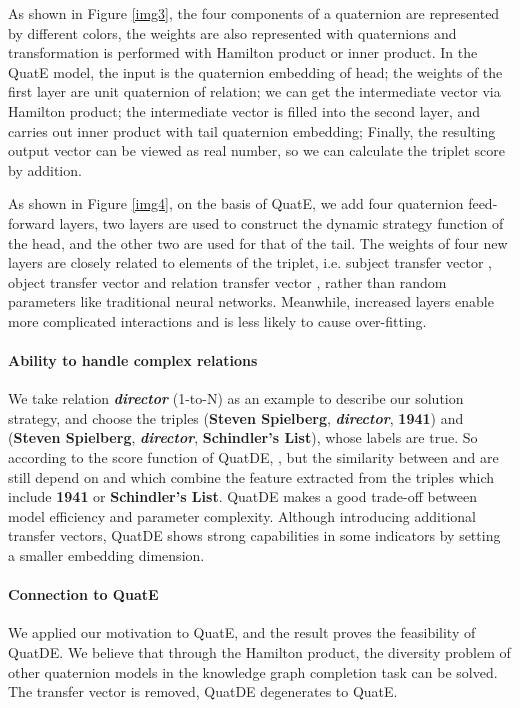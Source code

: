 \documentclass[letterpaper]{article} \usepackage{aaai20}  \usepackage{times}  \usepackage{helvet} \usepackage{courier}  \usepackage[hyphens]{url}  \usepackage{graphicx} \usepackage{lineno,hyperref,amsmath,amssymb}
\begin{document}
As shown in Figure \ref{img3}, the four components of a quaternion are represented by different colors, the weights are also represented with quaternions and transformation is performed with Hamilton product or inner product. In the QuatE model, the input is the quaternion embedding of head; the weights of the first layer are unit quaternion of relation; we can get the intermediate vector via Hamilton product; the intermediate vector is filled into the second layer, and carries out inner product with tail quaternion embedding; Finally, the resulting output vector can be viewed as real number, so we can calculate the triplet score by addition. 

As shown in Figure \ref{img4}, on the basis of QuatE, we add four quaternion feed-forward layers, two layers are used to construct the dynamic strategy function of the head, and the other two are used for that of the tail. The weights of four new layers are closely related to elements of the triplet, i.e. subject transfer vector , object transfer vector  and relation transfer vector , rather than random parameters like traditional neural networks. Meanwhile, increased layers enable more complicated interactions and is less likely to cause over-fitting.

\paragraph{\textbf{Ability to handle complex relations}}We take relation \textbf{\textit{director}} (1-to-N) as an example to describe our solution strategy, and choose the triples (\textbf{Steven Spielberg}, \textbf{\textit{director}}, \textbf{1941}) and (\textbf{Steven Spielberg}, \textbf{\textit{director}}, \textbf{Schindler’s List}), whose labels are true. So according to the score function of QuatDE, , but the similarity between  and  are still depend on   and  which combine the feature extracted from the triples which include \textbf{1941} or \textbf{Schindler’s List}. QuatDE makes a good trade-off between model efficiency and parameter complexity. Although introducing additional transfer vectors, QuatDE shows strong capabilities in some indicators by setting a smaller embedding dimension.

\paragraph{\textbf{Connection to QuatE}}We applied our motivation to QuatE, and the result proves the feasibility of QuatDE. We believe that through the Hamilton product, the diversity problem of other quaternion models in the knowledge graph completion task can be solved. The transfer vector is removed, QuatDE degenerates to QuatE.
\end{document}
